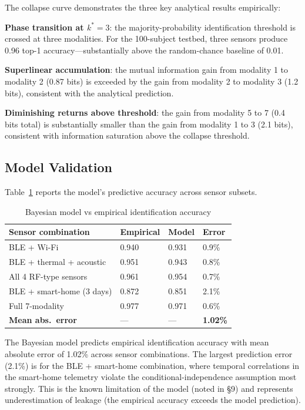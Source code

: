 \documentclass[sigconf,nonacm]{acmart}
\begin{document}
The collapse curve demonstrates the three key analytical
results empirically:

\textbf{Phase transition at $k^* = 3$}: the majority-probability
identification threshold is crossed at three modalities. For
the 100-subject testbed, three sensors produce 0.96 top-1
accuracy---substantially above the random-chance baseline of
0.01.

\textbf{Superlinear accumulation}: the mutual information gain
from modality 1 to modality 2 (0.87 bits) is exceeded by
the gain from modality 2 to modality 3 (1.2 bits), consistent
with the analytical prediction.

\textbf{Diminishing returns above threshold}: the gain from
modality 5 to 7 (0.4 bits total) is substantially smaller than
the gain from modality 1 to 3 (2.1 bits), consistent with
information saturation above the collapse threshold.

\subsection{Model Validation}

Table~\ref{tab:modelval} reports the model's predictive accuracy
across sensor subsets.

\begin{table}[h]
\caption{Bayesian model vs empirical identification accuracy}
\label{tab:modelval}
\small
\begin{tabularx}{\columnwidth}{@{}p{3.2cm}X X X@{}}
\toprule
\textbf{Sensor combination} & \textbf{Empirical} & \textbf{Model} & \textbf{Error} \\
\midrule
BLE + Wi-Fi              & 0.940 & 0.931 & 0.9\% \\
BLE + thermal + acoustic & 0.951 & 0.943 & 0.8\% \\
All 4 RF-type sensors    & 0.961 & 0.954 & 0.7\% \\
BLE + smart-home (3 days)& 0.872 & 0.851 & 2.1\% \\
Full 7-modality          & 0.977 & 0.971 & 0.6\% \\
\midrule
\textbf{Mean abs.\ error} & --- & --- & \textbf{1.02\%} \\
\bottomrule
\end{tabularx}
\end{table}

The Bayesian model predicts empirical identification accuracy
with mean absolute error of 1.02\% across sensor combinations.
The largest prediction error (2.1\%) is for the
BLE + smart-home combination, where temporal correlations in
the smart-home telemetry violate the conditional-independence
assumption most strongly. This is the known limitation of the
model (noted in §9) and represents underestimation of leakage
(the empirical accuracy exceeds the model prediction).
\end{document}

